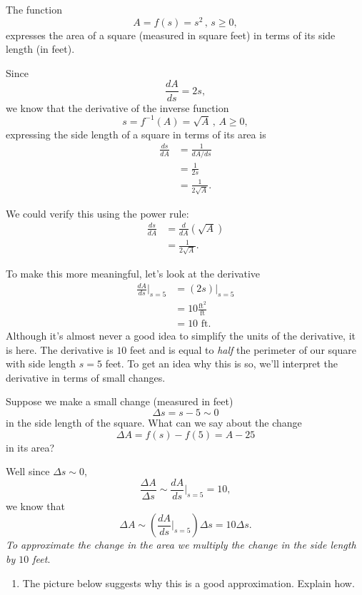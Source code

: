 \documentclass{ximera}
\begin{document}
\begin{example}  \label{ExLDKr3eDFRER}

The function
\[
         A = f(s) = s^2\, , \, s\geq 0 ,
\]
expresses the area of a square (measured in square feet) in terms of its side length (in feet).

Since
\[
   \frac{dA}{ds} = 2s ,
\]
we know that the derivative of the inverse function
\[
    s = f^{-1}(A)  = \sqrt{A}\, , \, A\geq 0,
\]
expressing the side length of a square in terms of its area is
\begin{align*}
 \frac{ds}{dA} &= \frac{1}{dA/ds} \\   
                      &= \frac{1}{2s} \\
                      &= \frac{1}{2\sqrt{A}} .
\end{align*}

We could verify this using the power rule:
\begin{align*}
 \frac{ds}{dA} &= \frac{d}{dA} \left( \sqrt{A} \right) \\   
                        &= \frac{1}{2\sqrt{A}} .
\end{align*}

To make this more meaningful, let's look at the derivative 
\begin{align*}
     \frac{dA}{ds}\Big|_{s=5} &= (2s)\Big|_{s=5} \\
                                           &= 10 \frac{\text{ft}^2}{\text{ft}} \\
                                           &= 10 \text{ ft}.
\end{align*}
Although it's almost never a good idea to simplify the units of the derivative, it is here. The derivative is $10$ feet and is equal to \emph{half} the perimeter of our square with side length $s=5$ feet. To get an idea why this is so, we'll interpret the derivative in terms of small changes.

Suppose we make a small change (measured in feet) 
\[
  \Delta s = s - 5 \sim 0 
\]
in the side length of the square. What can we say about the change 
\[
 \Delta A = f(s) - f(5) = A-25
\] 
in its area?
 
Well since $\Delta s \sim 0$,
\[
      \frac{\Delta A}{\Delta s} \sim   \frac{dA}{ds}\Big|_{s=5} = 10,
\]
we know that
\[
     \Delta A \sim  \left( \frac{dA}{ds}\Big|_{s=5}\right)\Delta s = 10 \Delta s .
\]
\emph{To approximate the change in the area we multiply the change in the side length by $10$ feet}.

\begin{enumerate}
\item The picture below suggests why this is a good approximation. Explain how. 


\end{enumerate}
\end{example}
\end{document}
